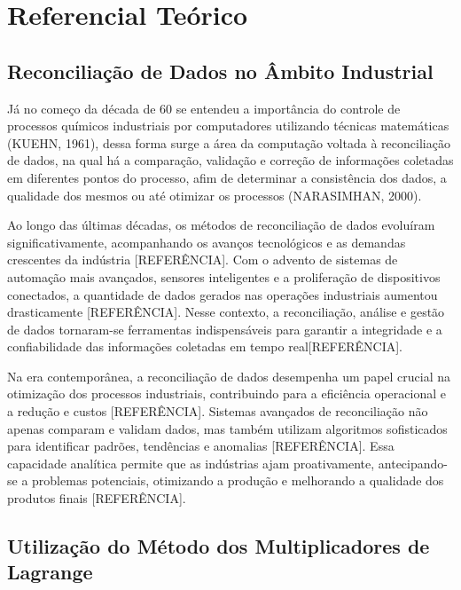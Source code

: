 \chapter{Referencial Teórico} \label{RevisaoBibliografica}

\section{Reconciliação de Dados no Âmbito Industrial}

Já no começo da década de 60 se entendeu a importância do controle de processos químicos industriais por computadores utilizando técnicas matemáticas (KUEHN, 1961), dessa forma surge a área da computação voltada à reconciliação de dados, na qual há a comparação, validação e correção de informações coletadas em diferentes pontos do processo, afim de determinar a consistência dos dados, a qualidade dos mesmos ou até otimizar os processos (NARASIMHAN, 2000).

Ao longo das últimas décadas, os métodos de reconciliação de dados evoluíram significativamente, acompanhando os avanços tecnológicos e as demandas crescentes da indústria [REFERÊNCIA]. Com o advento de sistemas de automação mais avançados, sensores inteligentes e a proliferação de dispositivos conectados, a quantidade de dados gerados nas operações industriais aumentou drasticamente [REFERÊNCIA]. Nesse contexto, a reconciliação, análise e gestão de dados tornaram-se ferramentas indispensáveis para garantir a integridade e a confiabilidade das informações coletadas em tempo real[REFERÊNCIA].

Na era contemporânea, a reconciliação de dados desempenha um papel crucial na otimização dos processos industriais, contribuindo para a eficiência operacional e a redução e custos [REFERÊNCIA]. Sistemas avançados de reconciliação não apenas comparam e validam dados, mas também utilizam algoritmos sofisticados para identificar padrões, tendências e anomalias [REFERÊNCIA]. Essa capacidade analítica permite que as indústrias ajam proativamente, antecipando-se a problemas potenciais, otimizando a produção e melhorando a qualidade dos produtos finais [REFERÊNCIA].

\section{Utilização do Método dos Multiplicadores de Lagrange}

